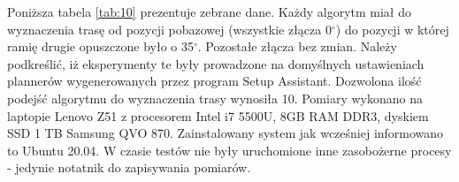 Poniższa tabela \ref{tab:10} prezentuje zebrane dane. Każdy algorytm miał do wyznaczenia trasę od pozycji pobazowej (wszystkie złącza 0$^\circ$) do pozycji w której ramię drugie opuszczone było o 35$^\circ$. Pozostałe złącza bez zmian.
 Należy podkreślić, iż eksperymenty te były prowadzone na domyślnych ustawieniach plannerów wygenerowanych przez program Setup Assistant. Dozwolona ilość podejść algorytmu do wyznaczenia trasy wynosiła 10. Pomiary wykonano na laptopie Lenovo Z51 z procesorem Intel i7 5500U, 8GB RAM DDR3, dyskiem SSD 1 TB Samsung QVO 870. Zainstalowany system jak wcześniej informowano to Ubuntu 20.04. W czasie testów nie były uruchomione inne zasobożerne procesy - jedynie notatnik do zapisywania pomiarów.   
